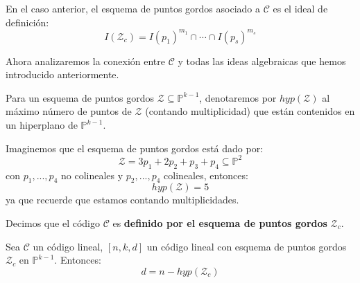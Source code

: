 \documentclass[12pt]{report}
\theoremstyle{largebreak}
\begin{document}
    \begin{mydef}
        En el caso anterior, el esquema de puntos gordos asociado a $\mathcal{C}$ es el ideal de definición:
        \begin{equation*}
            I(\mathcal{Z}_c)=I(p_1)^{ m_1}\cap\cdots\cap I(p_s)^{ m_s}
        \end{equation*}
    \end{mydef}

    Ahora analizaremos la conexión entre $\mathcal{C}$ y todas las ideas algebraicas que hemos introducido anteriormente.

    \begin{mydef}
        Para un esquema de puntos gordos $\mathcal{Z}\subseteq\mathbb{P}^{ k-1}$, denotaremos por $hyp(\mathcal{Z})$ al máximo número de puntos de $\mathcal{Z}$ (contando multiplicidad) que están contenidos en un hiperplano de $\mathbb{P}^{ k-1}$.
    \end{mydef}

    \begin{exa}
        Imaginemos que el esquema de puntos gordos está dado por:
        \begin{equation*}
            \mathcal{Z}=3p_1+2p_2+p_3+p_4\subseteq\mathbb{P}^2
        \end{equation*}
        con $p_1,...,p_4$ no colineales y $p_2,...,p_4$ colineales, entonces:
        \begin{equation*}
            hyp(\mathcal{Z})=5
        \end{equation*}
        ya que recuerde que estamos contando multiplicidades.
    \end{exa}

    \begin{mydef}
        Decimos que el código $\mathcal{C}$ es \textbf{definido por el esquema de puntos gordos} $\mathcal{Z}_c$.
    \end{mydef}

    \begin{propo}
        Sea $\mathcal{C}$ un código lineal, $[n,k,d]$ un código lineal con esquema de puntos gordos $\mathcal{Z}_c$ en $\mathbb{P}^{ k-1}$. Entonces:
        \begin{equation*}
            d=n-hyp(\mathcal{Z}_c)
        \end{equation*}
    \end{propo}
\end{document}
